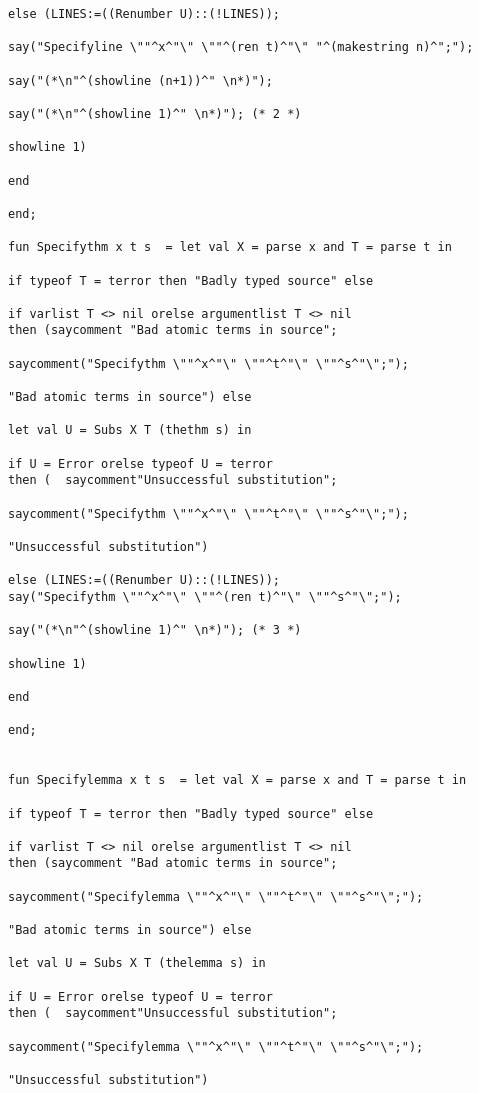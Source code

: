 \documentclass{article}
\begin{document}
{{\begin {verbatim}
else (LINES:=((Renumber U)::(!LINES));

say("Specifyline \""^x^"\" \""^(ren t)^"\" "^(makestring n)^";");

say("(*\n"^(showline (n+1))^" \n*)"); 

say("(*\n"^(showline 1)^" \n*)"); (* 2 *)

showline 1)

end

end;

fun Specifythm x t s  = let val X = parse x and T = parse t in

if typeof T = terror then "Badly typed source" else

if varlist T <> nil orelse argumentlist T <> nil 
then (saycomment "Bad atomic terms in source";

saycomment("Specifythm \""^x^"\" \""^t^"\" \""^s^"\";");

"Bad atomic terms in source") else

let val U = Subs X T (thethm s) in 

if U = Error orelse typeof U = terror 
then (  saycomment"Unsuccessful substitution";

saycomment("Specifythm \""^x^"\" \""^t^"\" \""^s^"\";");

"Unsuccessful substitution")

else (LINES:=((Renumber U)::(!LINES));
say("Specifythm \""^x^"\" \""^(ren t)^"\" \""^s^"\";");

say("(*\n"^(showline 1)^" \n*)"); (* 3 *)

showline 1)

end

end;


fun Specifylemma x t s  = let val X = parse x and T = parse t in

if typeof T = terror then "Badly typed source" else

if varlist T <> nil orelse argumentlist T <> nil 
then (saycomment "Bad atomic terms in source";

saycomment("Specifylemma \""^x^"\" \""^t^"\" \""^s^"\";");

"Bad atomic terms in source") else

let val U = Subs X T (thelemma s) in 

if U = Error orelse typeof U = terror 
then (  saycomment"Unsuccessful substitution";

saycomment("Specifylemma \""^x^"\" \""^t^"\" \""^s^"\";");

"Unsuccessful substitution")


\end{verbatim}}}
\end{document}
